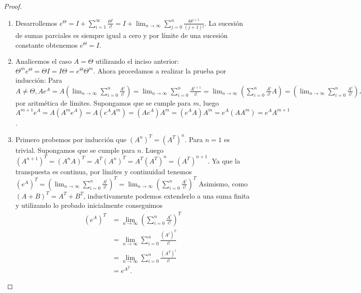 \documentclass{article}
\theoremstyle{definition}
\theoremstyle{remark}
\begin{document}
\begin{proof}
  \begin{enumerate}
    \item Desarrollemos $e^{\Theta} = I + \sum_{i = 1}^{\infty} \frac{\Theta^i}{i!}
    = I + \lim_{n \to \infty} \sum_{j = 0}^n \frac{\Theta^{j + 1}}{(j + 1)!}$.
    La sucesi\'on de sumas parciales es siempre igual a cero y por l\'imite de
    una sucesi\'on constante obtenemos $e^{\Theta} = I$.

    \item Analicemos el caso $A = \Theta$ utilizando el inciso anterior:
    $\Theta^m e^\Theta = \Theta I = I \Theta = e^{\Theta} \Theta^m$.
    Ahora procedamos a realizar la prueba por inducci\'on:
    Para $A \neq \Theta, A e^A = A (\lim_{n \to \infty} \sum_{i = 0}^n \frac{A^i}{i!}) =
    \lim_{n \to \infty} \sum_{i = 0}^n \frac{A^{i + 1}}{i!} =
    \lim_{n \to \infty} (\sum_{i = 0}^n \frac{A^i}{i!} A) =
    (\lim_{n \to \infty} \sum_{i = 0}^n \frac{A^i}{i!}) A =
    e^A A$ por aritm\'etica de l\'imites.
    Supongamos que se cumple para $m$, luego
    $A^{m + 1} e^A = A (A^m e^A) = A (e^A A^m) = (A e^A) A^m = (e^A A) A^m = e^A (A A^m) = e^A A^{m + 1}$.

    \item Primero probemos por inducci\'on que $(A^n)^T = (A^T)^n$.
    Para $n = 1$ es trivial.
    Supongamos que se cumple para $n$. Luego $(A^{n + 1})^T = (A^n A)^T = A^T (A^n)^T = A^T (A^T)^n = (A^T)^{n + 1}$.
    Ya que la transpuesta es continua, por l\'imites y continuidad tenemos
    $(e^A)^T = (\lim_{n \to \infty} \sum_{i = 0}^n \frac{A^i}{i!})^T = \lim_{n \to \infty} (\sum_{i = 0}^n \frac{A^i}{i!})^T$
    Asimismo, como $(A + B)^T = A^T + B^T$, inductivamente podemos extenderlo a
    una suma finita y utilizando lo probado inicialmente conseguimos
    \begin{align*}
      (e^A)^T &= \lim_{n \to \infty} \left(\sum_{i = 0}^n \frac{A^i}{i!}\right)^T\\
      &= \lim_{n \to \infty} \sum_{i = 0}^n \frac{(A^i)^T}{i!}\\
      &= \lim_{n \to \infty} \sum_{i = 0}^n \frac{(A^T)^i}{i!}\\
      &= e^{A^T}.
    \end{align*}
    

\end{enumerate}
\end{proof}
\end{document}
